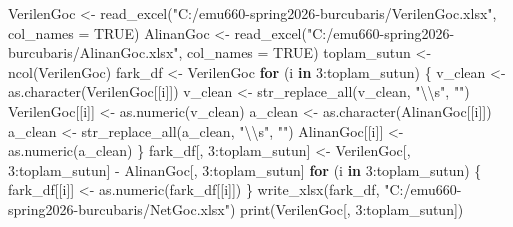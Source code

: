 \documentclass[
  11pt,
  a4paper,
  DIV=11,
  numbers=noendperiod]{scrartcl}
\newenvironment{Shaded}{\begin{snugshade}}{\end{snugshade}}
\newcommand{\AttributeTok}[1]{\textcolor[rgb]{0.40,0.45,0.13}{#1}}
\newcommand{\ConstantTok}[1]{\textcolor[rgb]{0.56,0.35,0.01}{#1}}
\newcommand{\ControlFlowTok}[1]{\textcolor[rgb]{0.00,0.23,0.31}{\textbf{#1}}}
\newcommand{\DecValTok}[1]{\textcolor[rgb]{0.68,0.00,0.00}{#1}}
\newcommand{\FunctionTok}[1]{\textcolor[rgb]{0.28,0.35,0.67}{#1}}
\newcommand{\NormalTok}[1]{\textcolor[rgb]{0.00,0.23,0.31}{#1}}
\newcommand{\OtherTok}[1]{\textcolor[rgb]{0.00,0.23,0.31}{#1}}
\newcommand{\SpecialCharTok}[1]{\textcolor[rgb]{0.37,0.37,0.37}{#1}}
\newcommand{\StringTok}[1]{\textcolor[rgb]{0.13,0.47,0.30}{#1}}
\begin{document}
\begin{Shaded}
\begin{Highlighting}[]
\NormalTok{VerilenGoc }\OtherTok{\textless{}{-}} \FunctionTok{read\_excel}\NormalTok{(}\StringTok{"C:/emu660{-}spring2026{-}burcubaris/VerilenGoc.xlsx"}\NormalTok{, }\AttributeTok{col\_names =} \ConstantTok{TRUE}\NormalTok{)}
\NormalTok{AlinanGoc  }\OtherTok{\textless{}{-}} \FunctionTok{read\_excel}\NormalTok{(}\StringTok{"C:/emu660{-}spring2026{-}burcubaris/AlinanGoc.xlsx"}\NormalTok{, }\AttributeTok{col\_names =} \ConstantTok{TRUE}\NormalTok{)}
\NormalTok{toplam\_sutun }\OtherTok{\textless{}{-}} \FunctionTok{ncol}\NormalTok{(VerilenGoc)}
\NormalTok{fark\_df }\OtherTok{\textless{}{-}}\NormalTok{ VerilenGoc }
\ControlFlowTok{for}\NormalTok{ (i }\ControlFlowTok{in} \DecValTok{3}\SpecialCharTok{:}\NormalTok{toplam\_sutun) \{}
\NormalTok{  v\_clean }\OtherTok{\textless{}{-}} \FunctionTok{as.character}\NormalTok{(VerilenGoc[[i]])}
\NormalTok{  v\_clean }\OtherTok{\textless{}{-}} \FunctionTok{str\_replace\_all}\NormalTok{(v\_clean, }\StringTok{"}\SpecialCharTok{\textbackslash{}\textbackslash{}}\StringTok{s"}\NormalTok{, }\StringTok{""}\NormalTok{) }
\NormalTok{  VerilenGoc[[i]] }\OtherTok{\textless{}{-}} \FunctionTok{as.numeric}\NormalTok{(v\_clean)        }
\NormalTok{  a\_clean }\OtherTok{\textless{}{-}} \FunctionTok{as.character}\NormalTok{(AlinanGoc[[i]])}
\NormalTok{  a\_clean }\OtherTok{\textless{}{-}} \FunctionTok{str\_replace\_all}\NormalTok{(a\_clean, }\StringTok{"}\SpecialCharTok{\textbackslash{}\textbackslash{}}\StringTok{s"}\NormalTok{, }\StringTok{""}\NormalTok{)    }
\NormalTok{  AlinanGoc[[i]] }\OtherTok{\textless{}{-}} \FunctionTok{as.numeric}\NormalTok{(a\_clean)}
\NormalTok{\}}
\NormalTok{fark\_df[, }\DecValTok{3}\SpecialCharTok{:}\NormalTok{toplam\_sutun] }\OtherTok{\textless{}{-}}\NormalTok{ VerilenGoc[, }\DecValTok{3}\SpecialCharTok{:}\NormalTok{toplam\_sutun] }\SpecialCharTok{{-}}\NormalTok{ AlinanGoc[, }\DecValTok{3}\SpecialCharTok{:}\NormalTok{toplam\_sutun]}
\ControlFlowTok{for}\NormalTok{ (i }\ControlFlowTok{in} \DecValTok{3}\SpecialCharTok{:}\NormalTok{toplam\_sutun) \{}
\NormalTok{  fark\_df[[i]] }\OtherTok{\textless{}{-}} \FunctionTok{as.numeric}\NormalTok{(fark\_df[[i]])}
\NormalTok{\}}
\FunctionTok{write\_xlsx}\NormalTok{(fark\_df, }\StringTok{"C:/emu660{-}spring2026{-}burcubaris/NetGoc.xlsx"}\NormalTok{)}
\FunctionTok{print}\NormalTok{(VerilenGoc[, }\DecValTok{3}\SpecialCharTok{:}\NormalTok{toplam\_sutun])}
\end{Highlighting}
\end{Shaded}
\end{document}
